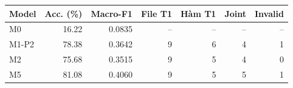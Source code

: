 \providecommand{\baselineModelName}{M1-P2}
\begin{tabular}{lrrrrrr}\toprule
Model & Acc. (\%) & Macro-F1 & File T1 & Hàm T1 & Joint & Invalid\\\midrule
M0 & 16.22 & 0.0835 & -- & -- & -- & --\\
\baselineModelName{} & 78.38 & 0.3642 & 9 & 6 & 4 & 1\\
M2 & 75.68 & 0.3515 & 9 & 5 & 4 & 0\\
M5 & 81.08 & 0.4060 & 9 & 5 & 5 & 1\\
\bottomrule\end{tabular}
